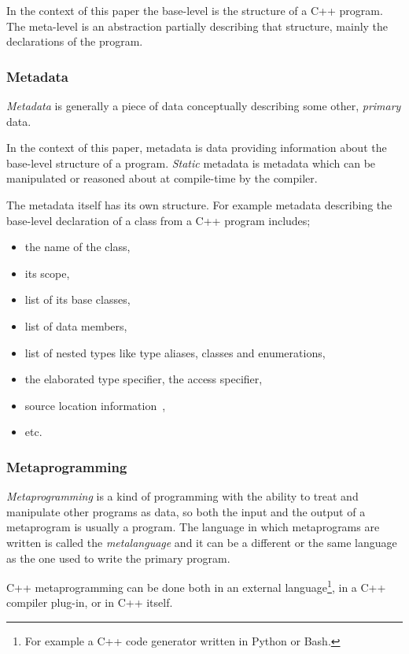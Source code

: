 In the context of this paper the base-level is the structure of a C++ program.
The meta-level is an abstraction partially describing that structure,
mainly the declarations of the program.

\subsubsection{Metadata}
\label{term-metadata}

{\em Metadata} is generally a piece of data conceptually describing some other,
{\em primary} data.

In the context of this paper, metadata is data providing information
about the base-level structure of a program.
{\em Static} metadata is metadata which can be manipulated or reasoned
about at compile-time by the compiler.

The metadata itself has its own structure.
For example metadata describing the base-level declaration of a class 
from a C++ program includes;
\begin{itemize}
\item the name of the class,
\item its scope,
\item list of its base classes,
\item list of data members,
\item list of nested types like type aliases, classes and enumerations,
\item the elaborated type specifier, the access specifier,
\item source location information~\cite{ISOCPP-N4519},
\item etc.
\end{itemize}

\subsubsection{Metaprogramming}

{\em Metaprogramming} is a kind of programming with the ability to treat and
manipulate other programs as data, so both the input and the output of
a metaprogram is usually a program. The language in which metaprograms
are written is called the {\em metalanguage} and it can be a different or the
same language as the one used to write the primary program.

C++ metaprogramming can be done both in an external language\footnote{For example a
C++ code generator written in Python or Bash.}, in a C++ compiler plug-in,
or in C++ itself. 

